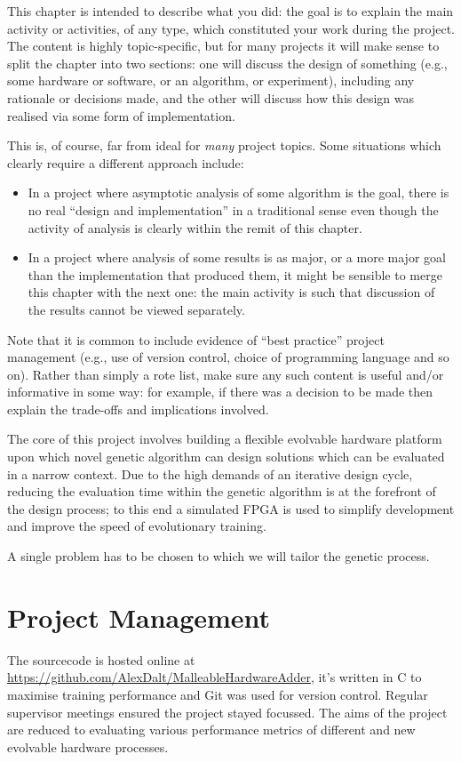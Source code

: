 {
\color{red}

This chapter is intended to describe what you did: the goal is to explain
the main activity or activities, of any type, which constituted your work
during the project.  The content is highly topic-specific, but for many
projects it will make sense to split the chapter into two sections: one
will discuss the design of something (e.g., some hardware or software, or
an algorithm, or experiment), including any rationale or decisions made,
and the other will discuss how this design was realised via some form of
implementation.

This is, of course, far from ideal for {\em many} project topics.  Some
situations which clearly require a different approach include:

\begin{itemize}
\item In a project where asymptotic analysis of some algorithm is the goal,
      there is no real ``design and implementation'' in a traditional sense
      even though the activity of analysis is clearly within the remit of
      this chapter.
\item In a project where analysis of some results is as major, or a more
      major goal than the implementation that produced them, it might be
      sensible to merge this chapter with the next one: the main activity
      is such that discussion of the results cannot be viewed separately.
\end{itemize}

\noindent
Note that it is common to include evidence of ``best practice'' project
management (e.g., use of version control, choice of programming language
and so on).  Rather than simply a rote list, make sure any such content
is useful and/or informative in some way: for example, if there was a
decision to be made then explain the trade-offs and implications
involved.
}

The core of this project involves building a flexible evolvable hardware
platform upon which novel genetic algorithm can design solutions which can be
evaluated in a narrow context. Due to the high demands of an iterative
design cycle, reducing the evaluation time within the genetic algorithm is
at the forefront of the design process; to this end a simulated FPGA is used
to simplify development and improve the speed of evolutionary training.

A single problem has to be chosen to which we will tailor the genetic process.

\section{Project Management}
The sourcecode is hosted online at \url{https://github.com/AlexDalt/MalleableHardwareAdder},
it's written in C to maximise training performance and Git was used for version control.
Regular supervisor meetings ensured the project stayed focussed. The aims
of the project are reduced to evaluating various performance metrics of
different and new evolvable hardware processes.

